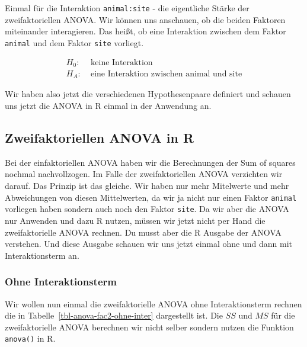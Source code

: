 \documentclass[
  letterpaper,
]{scrbook}
\begin{document}
Einmal für die Interaktion \texttt{animal:site} - die eigentliche Stärke
der zweifaktoriellen ANOVA. Wir können uns anschauen, ob die beiden
Faktoren miteinander interagieren. Das heißt, ob eine Interaktion
zwischen dem Faktor \texttt{animal} und dem Faktor \texttt{site}
vorliegt.

\[
\begin{align*}
H_0: &\; \mbox{keine Interaktion}\\
H_A: &\; \mbox{eine Interaktion zwischen animal und site}
\end{align*}
\]

Wir haben also jetzt die verschiedenen Hypothesenpaare definiert und
schauen uns jetzt die ANOVA in R einmal in der Anwendung an.

\hypertarget{zweifaktoriellen-anova-in-r}{%
\subsection{Zweifaktoriellen ANOVA in
R}\label{zweifaktoriellen-anova-in-r}}

Bei der einfaktoriellen ANOVA haben wir die Berechnungen der Sum of
squares nochmal nachvollzogen. Im Falle der zweifaktoriellen ANOVA
verzichten wir darauf. Das Prinzip ist das gleiche. Wir haben nur mehr
Mitelwerte und mehr Abweichungen von diesen Mittelwerten, da wir ja
nicht nur einen Faktor \texttt{animal} vorliegen haben sondern auch noch
den Faktor \texttt{site}. Da wir aber die ANOVA nur Anwenden und dazu R
nutzen, müssen wir jetzt nicht per Hand die zweifaktorielle ANOVA
rechnen. Du musst aber die R Ausgabe der ANOVA verstehen. Und diese
Ausgabe schauen wir uns jetzt einmal ohne und dann mit Interaktionsterm
an.

\hypertarget{ohne-interaktionsterm}{%
\subsubsection{Ohne Interaktionsterm}\label{ohne-interaktionsterm}}

Wir wollen nun einmal die zweifaktorielle ANOVA ohne Interaktionsterm
rechnen die in Tabelle~\ref{tbl-anova-fac2-ohne-inter} dargestellt ist.
Die \(SS\) und \(MS\) für die zweifaktorielle ANOVA berechnen wir nicht
selber sondern nutzen die Funktion \texttt{anova()} in R.
\end{document}
